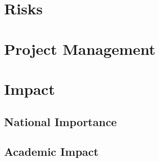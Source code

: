 \section{Risks}
\label{sec:risks}


% 


\section{Project Management}
\label{sec:project_management}


\section{Impact}
\label{sec:proposed_approach}


\subsection*{National Importance}
\label{sec:national_importance}

\subsection*{Academic Impact}
\label{sec:academic_impact}



\let\oldbibliography\thebibliography
\renewcommand{\thebibliography}[1]{\oldbibliography{#1}
\setlength{\itemsep}{-3pt}}


{
\scriptsize

}

